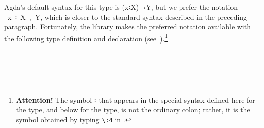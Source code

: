 \ccpad
Agda's default syntax for this type is (\ab x꞉\ab X)\as →\ab Y, but we prefer the notation ~\ab x~꞉~\ab X~,~\ab Y, which is closer to the standard syntax described in the preceding paragraph. Fortunately, the \typetopology library makes the preferred notation available with the following type definition and  declaration (see~\cite[Σ types]{MHE}).\footnote{\label{fncolon}\textbf{Attention!} The symbol \af ꞉ that appears in the special syntax defined here for the  type, and below for the  type, is not the ordinary colon; rather, it is the symbol obtained by typing \texttt{\textbackslash{}:4} in \agdatwomode.} 
\ccpad
\begin{code}%
\>[1]\AgdaSpace{}%
\AgdaSymbol{:}\AgdaSpace{}%
\AgdaSymbol{\{}\AgdaSpace{}%
\AgdaSpace{}%
\AgdaSymbol{:}\AgdaSpace{}%
\AgdaSymbol{\}}\AgdaSpace{}%
\AgdaSymbol{(}\AgdaSpace{}%
\AgdaSymbol{:}\AgdaSpace{}%
\AgdaSpace{}%
\AgdaSpace{}%
\AgdaSymbol{)}\AgdaSpace{}%
\AgdaSymbol{(}\AgdaSpace{}%
\AgdaSymbol{:}\AgdaSpace{}%
\AgdaSpace{}%
\AgdaSpace{}%
\AgdaSpace{}%
\AgdaSpace{}%
\AgdaSymbol{)}\AgdaSpace{}%
\AgdaSpace{}%
\AgdaSpace{}%
\AgdaSpace{}%
\AgdaSpace{}%
\<%
\\
%
\>[1]\AgdaSpace{}%
\AgdaSpace{}%
\AgdaSpace{}%
\AgdaSymbol{=}\AgdaSpace{}%
\AgdaSpace{}%
\<%
\\
%
\\[\AgdaEmptyExtraSkip]%
%
\>[1]\AgdaSpace{}%
\AgdaSpace{}%
\AgdaSpace{}%
\AgdaSpace{}%
\AgdaSpace{}%
\AgdaSpace{}%
\AgdaSymbol{)}\AgdaSpace{}%
\AgdaSymbol{=}\AgdaSpace{}%
\AgdaSpace{}%
\AgdaSpace{}%
\AgdaSpace{}%
\AgdaSpace{}%
\AgdaFunction{,}\AgdaSpace{}%
\<%
\end{code}
\scpad

